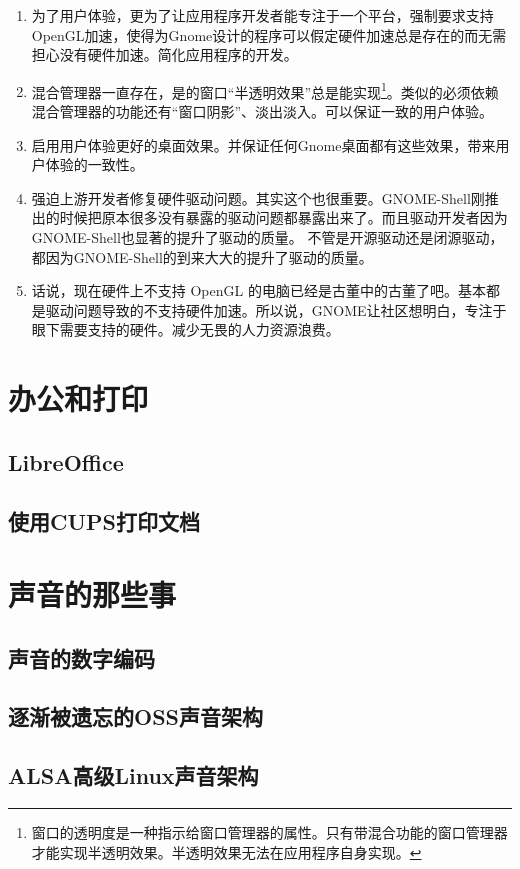 \documentclass[amstex,twoside]{ctexbook}
\begin{document}
\begin{enumerate}
\item 为了用户体验，更为了让应用程序开发者能专注于一个平台，强制要求支持OpenGL加速，使得为Gnome设计的程序可以假定硬件加速总是存在的而无需担心没有硬件加速。简化应用程序的开发。
\item 混合管理器一直存在，是的窗口“半透明效果”总是能实现\footnote{窗口的透明度是一种指示给窗口管理器的属性。只有带混合功能的窗口管理器才能实现半透明效果。半透明效果无法在应用程序自身实现。}。类似的必须依赖混合管理器的功能还有“窗口阴影”、淡出淡入。可以保证一致的用户体验。
\item 启用用户体验更好的桌面效果。并保证任何Gnome桌面都有这些效果，带来用户体验的一致性。
\item 强迫上游开发者修复硬件驱动问题。其实这个也很重要。GNOME-Shell刚推出的时候把原本很多没有暴露的驱动问题都暴露出来了。而且驱动开发者因为GNOME-Shell也显著的提升了驱动的质量。
不管是开源驱动还是闭源驱动，都因为GNOME-Shell的到来大大的提升了驱动的质量。

\item 话说，现在硬件上不支持 OpenGL 的电脑已经是古董中的古董了吧。基本都是驱动问题导致的不支持硬件加速。所以说，GNOME让社区想明白，专注于眼下需要支持的硬件。减少无畏的人力资源浪费。
\end{enumerate}



\section{办公和打印}
\subsection{LibreOffice}
\subsection{使用CUPS打印文档}
\section{声音的那些事}
\subsection{声音的数字编码}
\subsection{逐渐被遗忘的OSS声音架构}
\subsection{ALSA高级Linux声音架构}
\end{document}
